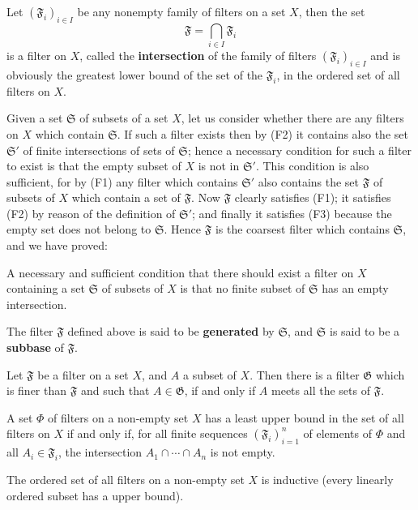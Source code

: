 Let $(\mathfrak{F}_i)_{i\in I}$ be any nonempty family of filters on a set $X$, then the set
\[\mathfrak{F}=\bigcap_{i\in I}\mathfrak{F}_i\]
is a filter on $X$, called the \textbf{intersection} of the family of filters $(\mathfrak{F}_i)_{i\in I}$ and is obviously the greatest lower bound of the set of the $\mathfrak{F}_i$, in the ordered set of all filters on $X$.\par
Given a set $\mathfrak{S}$ of subsets of a set $X$, let us consider whether there are any filters on $X$ which contain $\mathfrak{S}$. If such a filter exists then by (F2) it contains also the set $\mathfrak{S}'$ of finite intersections of sets of $\mathfrak{S}$; hence a necessary condition for such a filter to exist is that the empty subset of $X$ is not in $\mathfrak{S}'$. This condition is also sufficient, for by (F1) any filter which contains $\mathfrak{S}'$ also contains the set $\mathfrak{F}$ of subsets of $X$ which contain a set of $\mathfrak{F}$. Now $\mathfrak{F}$ clearly satisfies (F1); it satisfies (F2) by reason of the definition of $\mathfrak{S}'$; and finally it satisfies (F3) because the empty set does not belong to $\mathfrak{S}$. Hence $\mathfrak{F}$ is the coarsest filter which contains $\mathfrak{S}$, and we have proved:
\begin{proposition}
A necessary and sufficient condition that there should exist a filter on $X$ containing a set $\mathfrak{S}$ of subsets of $X$ is that no finite subset of $\mathfrak{S}$ has an empty intersection.
\end{proposition}
The filter $\mathfrak{F}$ defined above is said to be \textbf{generated} by $\mathfrak{S}$, and $\mathfrak{S}$ is said to be a \textbf{subbase} of $\mathfrak{F}$.
\begin{corollary}
Let $\mathfrak{F}$ be a filter on a set $X$, and $A$ a subset of $X$. Then there is a filter $\mathfrak{G}$ which is finer than $\mathfrak{F}$ and such that $A\in\mathfrak{G}$, if and only if $A$ meets all the sets of $\mathfrak{F}$.
\end{corollary}
\begin{corollary}\label{filter lub iff finite intersection prop}
A set $\Phi$ of filters on a non-empty set $X$ has a least upper bound in the set of all filters on $X$ if and only if, for all finite sequences $(\mathfrak{F}_i)_{i=1}^{n}$ of elements of $\Phi$ and all $A_i\in\mathfrak{F}_i$, the intersection $A_1\cap\cdots\cap A_n$ is not empty.
\end{corollary}
\begin{corollary}
The ordered set of all filters on a non-empty set $X$ is inductive (every linearly ordered subset has a upper bound).
\end{corollary}
